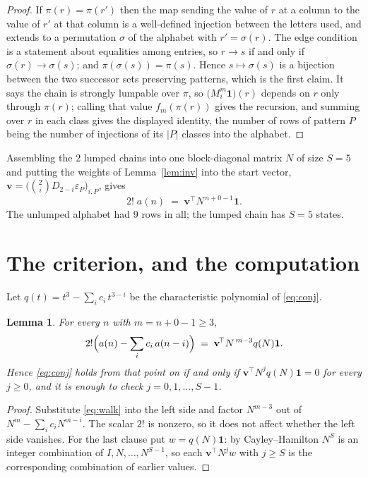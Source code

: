 \documentclass[11pt,a4paper]{article}
\theoremstyle{plain}
\newtheorem{lemma}[theorem]{Lemma}
\theoremstyle{definition}
\begin{document}
\begin{proof}
If $\pi(r)=\pi(r')$ then the map sending the value of $r$ at a column to the value of $r'$
at that column is a well-defined injection between the letters used, and extends to a
permutation $\sigma$ of the alphabet with $r'=\sigma(r)$. The edge condition is a statement
about equalities among entries, so $r\to s$ if and only if $\sigma(r)\to\sigma(s)$; and
$\pi(\sigma(s))=\pi(s)$. Hence $s\mapsto\sigma(s)$ is a bijection between the two successor
sets preserving patterns, which is the first claim. It says the chain is strongly lumpable
over $\pi$, so $\bigl(M_i^{m}\mathbf{1}\bigr)(r)$ depends on $r$ only through $\pi(r)$;
calling that value $f_m(\pi(r))$ gives the recursion, and summing over $r$ in each class
gives the displayed identity, the number of rows of pattern $P$ being the number of
injections of its $|P|$ classes into the alphabet.
\end{proof}

Assembling the $2$ lumped chains into one block-diagonal matrix $N$ of size $S=5$ and
putting the weights of Lemma~\ref{lem:inv} into the start vector,
$\mathbf{v}=\bigl(\binom{2}{i}D_{2-i}\varepsilon_P\bigr)_{i,P}$, gives
\begin{equation}\label{eq:walk}
2!\;a(n)\;=\;\mathbf{v}^{\!\top}N^{\,n+0-1}\mathbf{1} .
\end{equation}
The unlumped alphabet had $9$ rows in all; the lumped chain has $S=5$ states.

\section{The criterion, and the computation}

Let $q(t)=t^{3}-\sum_i c_i\,t^{3-i}$ be the characteristic polynomial of
\eqref{eq:conj}.

\begin{lemma}\label{lem:crit}
For every $n$ with $m=n+0-1\ge3$,
\[
2!\Bigl(a(n)-\sum_i c_i\,a(n-i)\Bigr)\;=\;\mathbf{v}^{\!\top}N^{\,m-3}q(N)\mathbf{1} .
\]
Hence \eqref{eq:conj} holds from that point on if and only if
$\mathbf{v}^{\!\top}N^{j}q(N)\mathbf{1}=0$ for every $j\ge0$, and it is enough to check
$j=0,1,\dots,S-1$.
\end{lemma}

\begin{proof}
Substitute \eqref{eq:walk} into the left side and factor $N^{m-3}$ out of
$N^{m}-\sum_i c_iN^{m-i}$. The scalar $2!$ is nonzero, so it does not affect whether
the left side vanishes. For the last clause put $w=q(N)\mathbf{1}$: by Cayley--Hamilton
$N^{S}$ is an integer combination of $I,N,\dots,N^{S-1}$, so each
$\mathbf{v}^{\!\top}N^{j}w$ with $j\ge S$ is the corresponding combination of earlier
values.
\end{proof}
\end{document}
